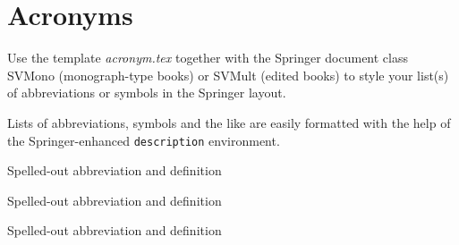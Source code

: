 %
%

\chapter{Acronyms}

Use the template \emph{acronym.tex} together with the Springer document class SVMono (monograph-type books) or SVMult (edited books) to style your list(s) of abbreviations or symbols in the Springer layout.

Lists of abbreviations, symbols and the like are easily formatted with the help of the Springer-enhanced \verb|description| environment.

\begin{description}[CABR]
\item[ABC]{Spelled-out abbreviation and definition}
\item[BABI]{Spelled-out abbreviation and definition}
\item[CABR]{Spelled-out abbreviation and definition}
\end{description}
